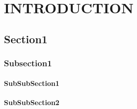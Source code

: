\chapter{INTRODUCTION}
\label{chp:introduction}

\section{Section1}

%

\subsection{Subsection1}
\subsubsection{SubSubSection1}
\subsubsection{SubSubSection2}
